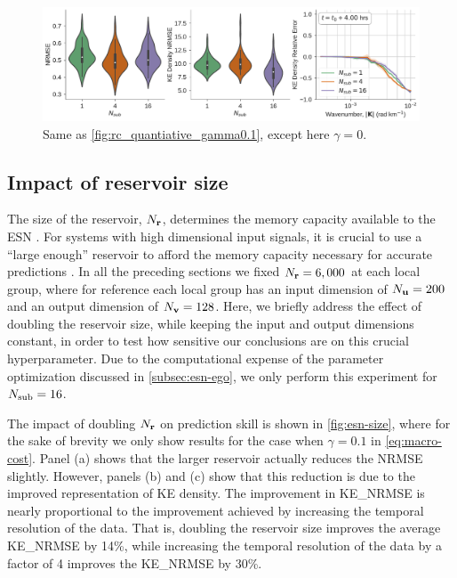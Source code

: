 \begin{figure}
    \centering
    \includegraphics[width=\textwidth]{../figures/rc_all_gamma0.0.pdf}
    \caption{Same as \cref{fig:rc_quantiative_gamma0.1}, except here $\gamma=0$.}
    \label{fig:rc_quantiative_gamma0.0}
\end{figure}

\subsection{Impact of reservoir size}
\label{subsec:esn-size}

The size of the reservoir, $N_{\mathbf{r}}$, determines the
memory capacity available to the ESN
\citep{jaeger_echo_2001,lukosevicius_practical_2012}.
For systems with high dimensional input signals, it is crucial to use a ``large
enough'' reservoir to afford the memory capacity necessary for accurate
predictions \citep{hermans_memory_2010}.
In all the preceding sections we fixed $N_{\mathbf{r}}=6,000$ at each local group,
where for reference each local group has an input dimension of
$N_{\mathbf{u}}=200$ and an output dimension of $N_{\mathbf{v}}=128$.
Here, we briefly address the effect of doubling the reservoir size,
while keeping the input and output dimensions constant, in order to test how
sensitive our conclusions are on this crucial hyperparameter.
Due to the computational expense of the parameter optimization discussed in
\cref{subsec:esn-ego}, we only perform this experiment for $N_\text{sub}=16$.

The impact of doubling $N_{\mathbf{r}}$ on prediction skill is shown in
\cref{fig:esn-size}, where for the sake of brevity we only show results for the
case when $\gamma=0.1$ in \cref{eq:macro-cost}.
Panel (a) shows that the larger reservoir actually reduces the NRMSE slightly.
However, panels (b) and (c) show that this reduction is due to the improved
representation of KE density.
The improvement in KE\_NRMSE is nearly proportional to the improvement achieved by increasing
the temporal resolution of the data.
That is, doubling the reservoir size improves the average KE\_NRMSE by 14\%,
while increasing the temporal resolution of the data by a factor of 4 improves
the KE\_NRMSE by 30\%.

